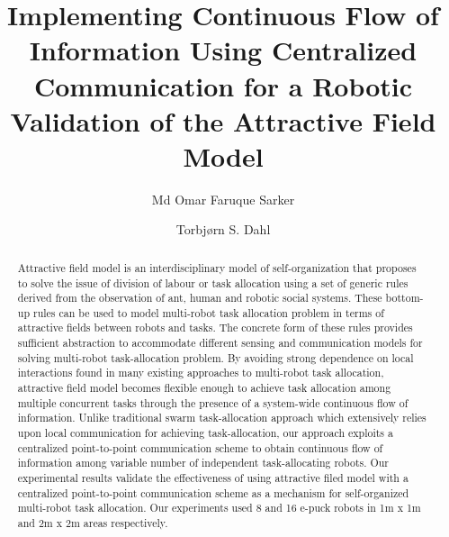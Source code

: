 \documentclass[smallcondensed]{svjour3}
\begin{document}
\title{Implementing Continuous Flow of Information Using Centralized Communication for a Robotic Validation of the Attractive Field Model}
\author{Md Omar Faruque Sarker \and
Torbj{\o}rn S. Dahl %
}
\maketitle
\begin{abstract}
Attractive field model is an interdisciplinary model of self-organization that proposes to solve the issue of division of labour or task allocation using a set of generic rules derived from the observation of ant, human and robotic social systems. These bottom-up rules can be used to model multi-robot task allocation problem in terms of attractive fields between robots and tasks. The concrete form of these rules provides sufficient abstraction to accommodate different sensing and communication models for solving multi-robot task-allocation problem. By avoiding strong dependence on local interactions found in many existing approaches to multi-robot task allocation, attractive field model becomes flexible enough to achieve task allocation among multiple concurrent tasks through the presence of a system-wide continuous flow of information. Unlike traditional swarm task-allocation approach which extensively relies upon local communication for achieving task-allocation, our approach exploits a centralized point-to-point communication scheme to obtain continuous flow of information among variable number of independent task-allocating robots. Our experimental results validate the effectiveness of using attractive filed model with a centralized point-to-point communication scheme as a mechanism for self-organized multi-robot task allocation. Our experiments used 8 and 16 e-puck robots in 1m x 1m and 2m x 2m areas respectively.
\end{abstract}
\end{document}

